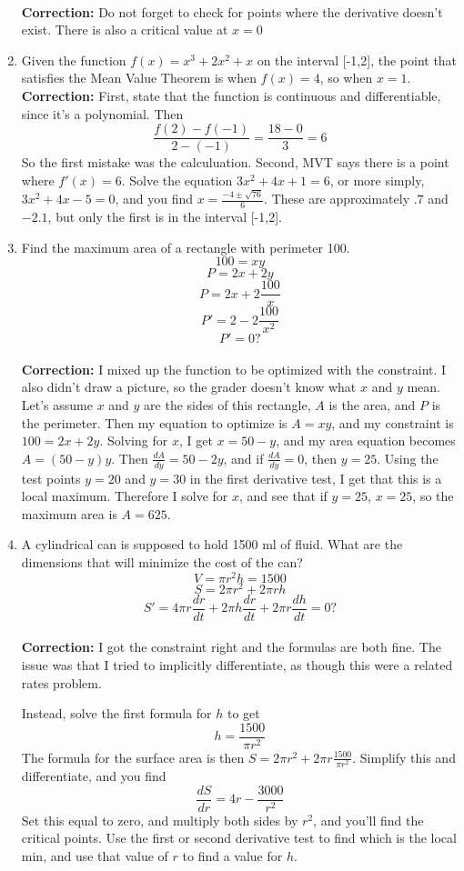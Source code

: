 \documentclass{article}
\begin{document}
\begin{enumerate}
\\ \textbf{Correction:} Do not forget to check for points where the derivative doesn't exist. There is also a critical value at $x=0$
\item Given the function $f(x) = x^3 + 2x^2 + x$ on the interval [-1,2], the point that satisfies the Mean Value Theorem is when $f(x) = 4$, so when $x=1$.
\\ \textbf{Correction:} First, state that the function is continuous and differentiable, since it's a polynomial. Then 
$$\frac{f(2) - f(-1)}{2 - (-1)} = \frac{18-0}{3} = 6$$ So the first mistake was the calculuation. Second, MVT says there is a point where $f'(x) = 6$. Solve the equation $3x^2 + 4x + 1 = 6$, or more simply, $3x^2 + 4x - 5 = 0$, and you find $x = \frac{-4 \pm \sqrt{76}}{6}$. These are approximately $.7$ and $-2.1$, but only the first is in the interval [-1,2].
\item Find the maximum area of a rectangle with perimeter 100.
$$100 = xy$$
$$P = 2x + 2y$$
$$P = 2x + 2\frac{100}{x}$$
$$P' = 2 - 2\frac{100}{x^2}$$
$$P' = 0?$$
\\ \textbf{Correction:} I mixed up the function to be optimized with the constraint. I also didn't draw a picture, so the grader doesn't know what $x$ and $y$ mean. Let's assume $x$ and $y$ are the sides of this rectangle, $A$ is the area, and $P$ is the perimeter. Then my equation to optimize is $A = xy$, and my constraint is $100 = 2x + 2y$. Solving for $x$, I get $x = 50-y$, and my area equation becomes $A = (50-y)y$. Then $\frac{dA}{dy} = 50 - 2y$, and if $\frac{dA}{dy} = 0$, then $y = 25$. Using the test points $y = 20$ and $y = 30$ in the first derivative test, I get that this is a local maximum. Therefore I solve for $x$, and see that if $y = 25$, $x = 25$, so the maximum area is $A = 625$.
\item A cylindrical can is supposed to hold 1500 ml of fluid. What are the dimensions that will minimize the cost of the can?
$$V = \pi r^2 h = 1500$$
$$S = 2\pi r^2 + 2\pi rh$$
$$S' = 4\pi r \frac{dr}{dt} + 2\pi h \frac{dr}{dt} + 2\pi r \frac{dh}{dt} = 0?$$
\\ \textbf{Correction:} I got the constraint right and the formulas are both fine. The issue was that I tried to implicitly differentiate, as though this were a related rates problem.

Instead, solve the first formula for $h$ to get $$h = \frac{1500}{\pi r^2}$$
The formula for the surface area is then $S = 2\pi r^2 + 2\pi r \frac{1500}{\pi r^2}$. Simplify this and differentiate, and you find
$$\frac{dS}{dr} = 4r - \frac{3000}{r^2}$$
Set this equal to zero, and multiply both sides by $r^2$, and you'll find the critical points. Use the first or second derivative test to find which is the local min, and use that value of $r$ to find a value for $h$.
\end{enumerate}
\end{document}
